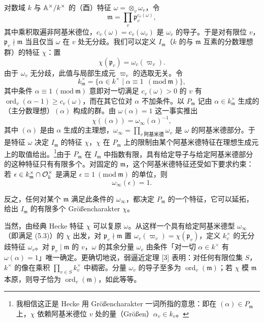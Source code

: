 对数域 $k$ 与 $\mathbb{A}^\times/k^\times$ 的（酉）特征 $\omega=\otimes_v\omega_v$，令
\begin{equation*}\tag{5.1}
\mathfrak m=\prod_v\mathfrak p_v^{c_v(\omega)},
\end{equation*}
其中乘积取遍非阿基米德位，$c_v(\omega)=c_v(\omega_v)$ 是 $\omega_v$ 的导子。于是对有限位 $v$，$\mathfrak p_v\nmid\mathfrak m$ 当且仅当 $\omega$ 在 $v$ 处无分歧。我们可以定义 $I_{\mathfrak m}$（$k$ 的与 $\mathfrak m$ 互素的分数理想群）的特征 $\chi$：置
\[
\chi(\mathfrak p_v)=\omega_v(\varpi_v).
\]
由于 $\omega_v$ 无分歧，此值与局部生成元 $\varpi_v$ 的选取无关。令
\begin{equation*}\tag{5.2}
k^\times_{\mathfrak m}=\{\alpha\in k^\times\mid\alpha\equiv1\ \ (\mathrm{mod}\ \mathfrak m)\},
\end{equation*}
其中条件 $\alpha\equiv1\ (\mathrm{mod}\ \mathfrak m)$ 意即对一切满足 $c_v(\omega)>0$ 的 $v$ 有 $\operatorname{ord}_v(\alpha-1)\ge c_v(\omega)$，而在其它位对 $\alpha$ 不加条件。以 $P_{\mathfrak m}$ 记由 $\alpha\in k^\times_{\mathfrak m}$ 生成的（主分数理想）$(\alpha)$ 构成的群。由 $\omega(\alpha)=1$ 这一事实推出
\begin{equation*}\tag{5.3}
\chi((\alpha))=\omega_\infty(\alpha)^{-1},
\end{equation*}
其中 $(\alpha)$ 是由 $\alpha$ 生成的主理想，$\omega_\infty=\prod_{v\ \text{阿基米德}}\omega_v$ 是 $\omega$ 的阿基米德部分。于是特征 $\omega$ 决定 $I_{\mathfrak m}$ 的特征 $\chi$，$\chi$ 在 $P_{\mathfrak m}$ 上的限制由某个阿基米德特征在理想生成元上的取值给出。\footnote{我相信这正是 Hecke 用 Gr\"o\ss encharakter 一词所指的意思：即在 $(\alpha)\in P_{\mathfrak m}$ 上，$\chi$ 依赖阿基米德位 $v$ 处的量（Gr\"o\ss en）$\alpha_v\in k_v$。}由于 $P_{\mathfrak m}$ 在 $I_{\mathfrak m}$ 中指数有限，具有给定导子与给定阿基米德部分的这种特征只有有限多个。对固定的 $\mathfrak m$，这个阿基米德特征还受如下要求约束：若 $\epsilon\in k^\times_{\mathfrak m}\cap\mathcal{O}_k^\times$ 是满足 $\epsilon\equiv1\ (\mathrm{mod}\ \mathfrak m)$ 的单位，则
\begin{equation*}\tag{5.4}
\omega_\infty(\epsilon)=1.
\end{equation*}

反之，任何对某个 $\mathfrak m$ 满足此条件的 $\omega_\infty$，都决定 $P_{\mathfrak m}$ 的一个特征，它可以延拓，给出 $I_{\mathfrak m}$ 的有限多个 Gr\"o\ss encharakter $\chi$。

当然，由经典 Hecke 特征 $\chi$ 可以复原 $\omega$。从这样一个具有给定阿基米德型 $\omega_\infty$（即满足 (5.3)）的 $\chi$ 出发，对 $\mathfrak p_v\nmid\mathfrak m$ 置 $\omega_v(\varpi_v)=\chi(\mathfrak p_v)$，定义 $k_v^\times$ 的无分歧特征 $\omega_v$。对 $\mathfrak p_v\mid\mathfrak m$ 的 $v$，$\omega$ 的其余分量 $\omega_v$ 由条件「对一切 $\alpha\in k^\times$ 有 $\omega(\alpha)=1$」唯一确定。更确切地说，弱逼近定理 [3] 表明：对任何有限位集 $S$，$k^\times$ 的像在乘积 $\prod_{v\in S}k_v^\times$ 中稠密。分量 $\omega_v$ 的导子至多为 $\operatorname{ord}_v(\mathfrak m)$；若 $\chi$ 模 $\mathfrak m$ 本原，则导子恰为 $\operatorname{ord}_v(\mathfrak m)$，如此等等。


